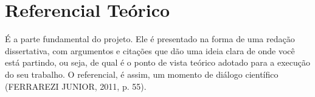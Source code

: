 \chapter{Referencial Teórico}

É a parte fundamental do projeto. Ele é presentado na forma de uma
redação dissertativa, com argumentos e citações que dão uma ideia clara de
onde você está partindo, ou seja, de qual é o ponto de vista teórico adotado
para a execução do seu trabalho. O referencial, é assim, um momento de
diálogo científico (FERRAREZI JUNIOR, 2011, p. 55).